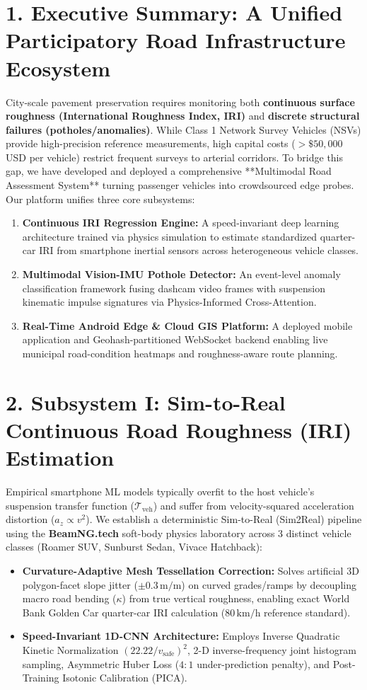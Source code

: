 \documentclass[9pt,a4paper]{extarticle}
\begin{document}
\section{1. Executive Summary: A Unified Participatory Road Infrastructure Ecosystem}
City-scale pavement preservation requires monitoring both \textbf{continuous surface roughness (International Roughness Index, IRI)} and \textbf{discrete structural failures (potholes/anomalies)}. While Class 1 Network Survey Vehicles (NSVs) provide high-precision reference measurements, high capital costs ($>\$50,000$ USD per vehicle) restrict frequent surveys to arterial corridors. To bridge this gap, we have developed and deployed a comprehensive **Multimodal Road Assessment System** turning passenger vehicles into crowdsourced edge probes. Our platform unifies three core subsystems:
\begin{enumerate}
    \item \textbf{Continuous IRI Regression Engine:} A speed-invariant deep learning architecture trained via physics simulation to estimate standardized quarter-car IRI from smartphone inertial sensors across heterogeneous vehicle classes.
    \item \textbf{Multimodal Vision-IMU Pothole Detector:} An event-level anomaly classification framework fusing dashcam video frames with suspension kinematic impulse signatures via Physics-Informed Cross-Attention.
    \item \textbf{Real-Time Android Edge \& Cloud GIS Platform:} A deployed mobile application and Geohash-partitioned WebSocket backend enabling live municipal road-condition heatmaps and roughness-aware route planning.
\end{enumerate}

\section{2. Subsystem I: Sim-to-Real Continuous Road Roughness (IRI) Estimation}
Empirical smartphone ML models typically overfit to the host vehicle's suspension transfer function ($\mathcal{T}_{\text{veh}}$) and suffer from velocity-squared acceleration distortion ($a_z \propto v^2$). We establish a deterministic Sim-to-Real (Sim2Real) pipeline using the \textbf{BeamNG.tech} soft-body physics laboratory across 3 distinct vehicle classes (Roamer SUV, Sunburst Sedan, Vivace Hatchback):
\begin{itemize}
    \item \textbf{Curvature-Adaptive Mesh Tessellation Correction:} Solves artificial 3D polygon-facet slope jitter ($\pm 0.3\,\text{m/m}$) on curved grades/ramps by decoupling macro road bending ($\kappa$) from true vertical roughness, enabling exact World Bank Golden Car quarter-car IRI calculation ($80\,\text{km/h}$ reference standard).
    \item \textbf{Speed-Invariant 1D-CNN Architecture:} Employs Inverse Quadratic Kinetic Normalization $(22.22/v_{\text{safe}})^2$, 2-D inverse-frequency joint histogram sampling, Asymmetric Huber Loss ($4:1$ under-prediction penalty), and Post-Training Isotonic Calibration (PICA).
\end{itemize}
\end{document}
